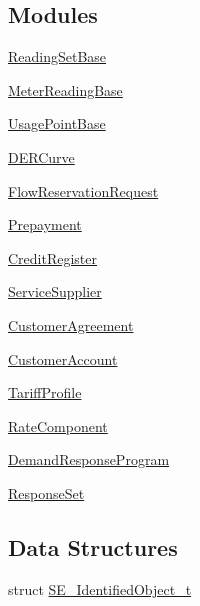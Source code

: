 \subsection*{Modules}
\begin{DoxyCompactItemize}
\item 
\hyperlink{group__ReadingSetBase}{Reading\+Set\+Base}
\item 
\hyperlink{group__MeterReadingBase}{Meter\+Reading\+Base}
\item 
\hyperlink{group__UsagePointBase}{Usage\+Point\+Base}
\item 
\hyperlink{group__DERCurve}{D\+E\+R\+Curve}
\item 
\hyperlink{group__FlowReservationRequest}{Flow\+Reservation\+Request}
\item 
\hyperlink{group__Prepayment}{Prepayment}
\item 
\hyperlink{group__CreditRegister}{Credit\+Register}
\item 
\hyperlink{group__ServiceSupplier}{Service\+Supplier}
\item 
\hyperlink{group__CustomerAgreement}{Customer\+Agreement}
\item 
\hyperlink{group__CustomerAccount}{Customer\+Account}
\item 
\hyperlink{group__TariffProfile}{Tariff\+Profile}
\item 
\hyperlink{group__RateComponent}{Rate\+Component}
\item 
\hyperlink{group__DemandResponseProgram}{Demand\+Response\+Program}
\item 
\hyperlink{group__ResponseSet}{Response\+Set}
\end{DoxyCompactItemize}
\subsection*{Data Structures}
\begin{DoxyCompactItemize}
\item 
struct \hyperlink{structSE__IdentifiedObject__t}{S\+E\+\_\+\+Identified\+Object\+\_\+t}
\end{DoxyCompactItemize}
